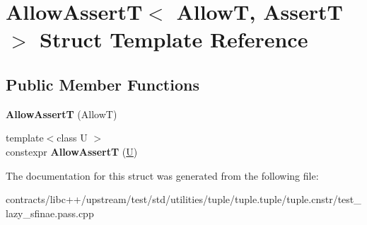 \hypertarget{struct_allow_assert_t}{}\section{Allow\+AssertT$<$ AllowT, AssertT $>$ Struct Template Reference}
\label{struct_allow_assert_t}
\subsection*{Public Member Functions}
\begin{DoxyCompactItemize}
\item 
\mbox{\label{struct_allow_assert_t_a0561bd0540cc14ca3a1b2d1233fcefd4}} 
{\bfseries Allow\+AssertT} (AllowT)
\item 
\mbox{\label{struct_allow_assert_t_a4b132e36e52154217eac5f9086dce9c1}} 
{\footnotesize template$<$class U $>$ }\\constexpr {\bfseries Allow\+AssertT} (\mbox{\hyperlink{union_u}{U}})
\end{DoxyCompactItemize}


The documentation for this struct was generated from the following file\+:\begin{DoxyCompactItemize}
\item 
contracts/libc++/upstream/test/std/utilities/tuple/tuple.\+tuple/tuple.\+cnstr/test\+\_\+lazy\+\_\+sfinae.\+pass.\+cpp\end{DoxyCompactItemize}
